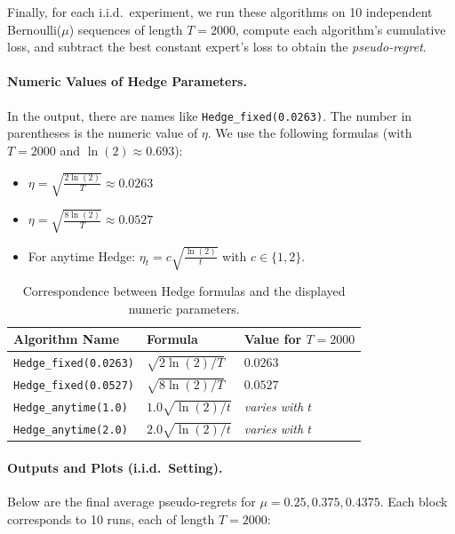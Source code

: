 Finally, for each i.i.d.\ experiment, we run these algorithms on 10 independent Bernoulli(\(\mu\)) sequences of length \(T=2000\), compute each algorithm's cumulative loss, and subtract the best constant expert's loss to obtain the \emph{pseudo-regret}.

\paragraph{Numeric Values of Hedge Parameters.}
In the output, there are names like \texttt{Hedge\_fixed(0.0263)}.  The number in parentheses is the numeric value of \(\eta\).  We use the following formulas (with \(T=2000\) and \(\ln(2)\approx 0.693\)):

\begin{itemize}
\item \(\eta = \sqrt{\frac{2\ln(2)}{T}}\approx 0.0263\)
\item \(\eta = \sqrt{\frac{8\ln(2)}{T}}\approx 0.0527\)
\item For anytime Hedge: \(\eta_t = c \sqrt{\frac{\ln(2)}{t}}\) with \(c \in \{1,2\}\).
\end{itemize}

\begin{table}[h!]
\centering
\begin{tabular}{lll}
\hline
\textbf{Algorithm Name} & \textbf{Formula} & \textbf{Value for $T=2000$}\\
\hline
\texttt{Hedge\_fixed(0.0263)} & $\sqrt{2\ln(2)/T}$ & $0.0263$ \\
\texttt{Hedge\_fixed(0.0527)} & $\sqrt{8\ln(2)/T}$ & $0.0527$ \\
\texttt{Hedge\_anytime(1.0)}  & $1.0\sqrt{\ln(2)/t}$ & \emph{varies with $t$} \\
\texttt{Hedge\_anytime(2.0)}  & $2.0\sqrt{\ln(2)/t}$ & \emph{varies with $t$} \\
\hline
\end{tabular}
\caption{Correspondence between Hedge formulas and the displayed numeric parameters.}
\label{tab:hedge_values}
\end{table}

\paragraph{Outputs and Plots (i.i.d.\ Setting).}
Below are the final average pseudo-regrets for \(\mu=0.25, 0.375, 0.4375\).  Each block corresponds to 10 runs, each of length \(T=2000\):

